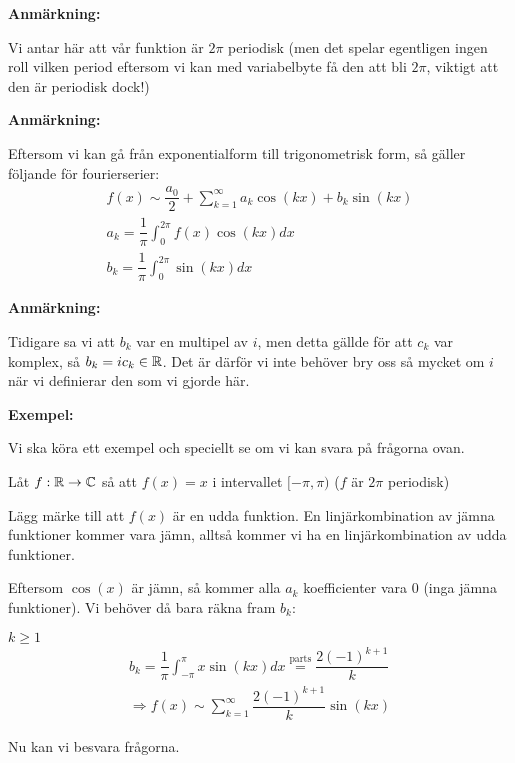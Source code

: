 \noindent\textbf{Anmärkning:}\par
\noindent Vi antar här att vår funktion är $2\pi$ periodisk (men det spelar egentligen ingen roll vilken period eftersom vi kan med variabelbyte få den att bli $2\pi$, viktigt att den är periodisk dock!)
\par\bigskip
\noindent\textbf{Anmärkning:}\par
\noindent Eftersom vi kan gå från exponentialform till trigonometrisk form, så gäller följande för fourierserier:
\begin{equation*}
  \begin{gathered}
    f(x)\sim \dfrac{a_0}{2}+\sum_{k=1}^{\infty}a_k\cos(kx)+b_k\sin(kx)\\
    a_k = \dfrac{1}{\pi}\int_{0}^{2\pi}f(x)\cos(kx)dx\\
    b_k = \dfrac{1}{\pi}\int_{0}^{2\pi}\sin(kx)dx
  \end{gathered}
\end{equation*}
\par\bigskip
\noindent\textbf{Anmärkning:}\par
\noindent Tidigare sa vi att $b_k$ var en multipel av $i$, men detta gällde för att $c_k$ var komplex, så $b_k = ic_k\in\mathbb{R}$. Det är därför vi inte behöver bry oss så mycket om $i$ när vi definierar den som vi gjorde här.
\par\bigskip
\noindent\textbf{Exempel:}\par
\noindent Vi ska köra ett exempel och speciellt se om vi kan svara på frågorna ovan.
\par\bigskip
\noindent Låt $f:\mathbb{R}\to\mathbb{C}$ så att $f(x) = x$ i intervallet $[-\pi,\pi)$ ($f$ är $2\pi$ periodisk)
\par\bigskip
\noindent Lägg märke till att $f(x)$ är en udda funktion. En linjärkombination av jämna funktioner kommer vara jämn, alltså kommer vi ha en linjärkombination av udda funktioner.\par
\noindent Eftersom $\cos(x)$ är jämn, så kommer alla $a_k$ koefficienter vara 0 (inga jämna funktioner). Vi behöver då bara räkna fram $b_k$:\par
$k\geq1$
\begin{equation*}
  \begin{gathered}
    b_k = \dfrac{1}{\pi}\int_{-\pi}^{\pi}x\sin(kx)dx \stackrel{\text{parts}}{=} \dfrac{2(-1)^{k+1}}{k}\\
    \Rightarrow f(x)\sim\sum_{k=1}^{\infty}\dfrac{2(-1)^{k+1}}{k}\sin(kx)
  \end{gathered}
\end{equation*}
\par\bigskip
\noindent Nu kan vi besvara frågorna.
